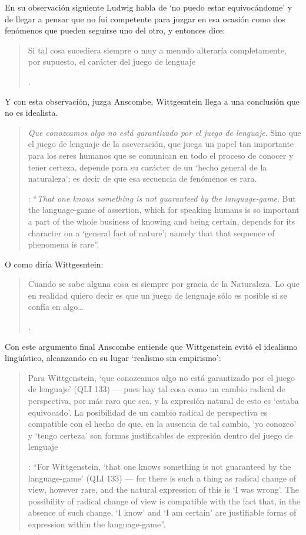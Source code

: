 En su observación siguiente Ludwig habla de \enquote*{no puedo estar equivocándome} y de llegar a pensar que no fui competente para juzgar en esa ocasión como dos fenómenos que pueden seguirse uno del otro, y entonces dice: \blockquote[{\Cite[\S646]{wittgenstein1969oncertes}}.
]{Si tal cosa sucediera siempre o muy a menudo alteraría completamente, por supuesto, el carácter del juego de lenguaje}. Y con esta observación, juzga Anscombe, Wittgesntein llega a una conclusión que no es idealista.  \blockquote[{\Cite[133]{anscombe1981parmenides:qli}}: \enquote{\emph{That one knows something is not guaranteed by the language-game}. \textelp{} But the language-game of assertion, which for speaking humans is so important a part of the whole business of knowing and being certain, depends for its character on a `general fact of nature'; namely that that sequence of phenomena is rare}.]{\emph{Que conozcamos algo no está garantizado por el juego de lenguaje}. Sino que el juego de lenguaje de la aseveración, que juega un papel tan importante para los seres humanos que se comunican en todo el proceso de conocer y tener certeza, depende para su carácter de un `hecho general de la naturaleza'; es decir de que esa secuencia de fenómenos es rara.} O como diría Wittgesntein: \blockquote[{\Cite[\S505; 509]{wittgenstein1969oncertes}}.
]{Cuando se sabe alguna cosa es siempre por gracia de la Naturaleza. \textelp{} Lo que en realidad quiero decir es que un juego de lenguaje sólo es posible si se confía en algo\ldots}.

Con este argumento final Anscombe entiende que Wittgenstein evitó el idealismo lingüístico, alcanzando en su lugar `realismo sin empirismo': \blockquote[{\Cite[224]{teichmann2008ans}}: \enquote{For Wittgenstein, `that one knows something is not guaranteed by the language-game' (QLI 133) --- for there is such a thing as radical change of view, however rare, and the natural expression of this is `I was wrong'. The possibility of radical change of view is compatible with the fact that, in the absence of such change, `I know' and `I am certain' are justifiable forms of expression within the language-game}.]{Para Wittgenstein, `que conozcamos algo no está garantizado por el juego de lenguaje' (QLI 133) --- pues hay tal cosa como un cambio radical de perspectiva, por más raro que sea, y la expresión natural de esto es `estaba equivocado'. La posibilidad de un cambio radical de perspectiva es compatible con el hecho de que, en la ausencia de tal cambio, `yo conozco' y `tengo certeza' son formas justificables de expresión dentro del juego de lenguaje}.

